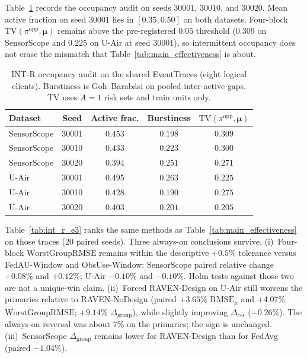 Table~\ref{tab:int_r_occ} records the occupancy audit on seeds
$30001$, $30010$, and $30020$.  Mean active fraction on seed $30001$
lies in $[0.35,0.50]$ on both datasets.  Four-block
$\mathrm{TV}(\pi^{\mathrm{opp}},\boldsymbol\mu)$ remains above the
pre-registered $0.05$ threshold ($0.309$ on SensorScope and $0.225$ on
U-Air at seed $30001$), so intermittent occupancy does not erase the
mismatch that Table~\ref{tab:main_effectiveness} is about.

\begin{table}[!htbp]
\centering
\caption{INT-R occupancy audit on the shared EventTraces (eight logical
clients).  Burstiness is Goh--Barab\'asi on pooled inter-active gaps.
$\mathrm{TV}$ uses $A=1$ risk sets and train units only.}
\label{tab:int_r_occ}
\scriptsize
\begin{tabular}{lcccc}
\toprule
Dataset & Seed & Active frac. & Burstiness & $\mathrm{TV}(\pi^{\mathrm{opp}},\boldsymbol\mu)$\\
\midrule
SensorScope & 30001 & $0.453$ & $0.198$ & $0.309$\\
SensorScope & 30010 & $0.433$ & $0.223$ & $0.300$\\
SensorScope & 30020 & $0.394$ & $0.251$ & $0.271$\\
U-Air & 30001 & $0.495$ & $0.263$ & $0.225$\\
U-Air & 30010 & $0.428$ & $0.190$ & $0.275$\\
U-Air & 30020 & $0.403$ & $0.201$ & $0.205$\\
\bottomrule
\end{tabular}
\end{table}

Table~\ref{tab:int_r_e3} ranks the same methods as
Table~\ref{tab:main_effectiveness} on those traces ($20$ paired seeds).
Three always-on conclusions survive.  (i)~Four-block
$\mathrm{WorstGroupRMSE}$ remains within the descriptive $+0.5\%$
tolerance versus FedAU-Window
and ObsUse-Window: SensorScope paired relative
change $+0.08\%$ and $+0.12\%$; U-Air $-0.10\%$ and $-0.10\%$.  Holm tests
against those two are not a unique-win claim.  (ii)~Forced RAVEN-Design on U-Air
still worsens the primaries relative to RAVEN-NoDesign
(paired $+3.65\%$ $\mathrm{RMSE}_{\mu}$ and $+4.07\%$
$\mathrm{WorstGroupRMSE}$; $+9.14\%$ $\Delta_{\mathrm{group}}$), while
slightly improving $\Delta_{c\text{-}s}$ ($-0.26\%$).  The always-on
reversal was about $7\%$ on the primaries; the sign is unchanged.
(iii)~SensorScope $\Delta_{\mathrm{group}}$ remains lower for
RAVEN-Design than for FedAvg (paired $-1.04\%$).

